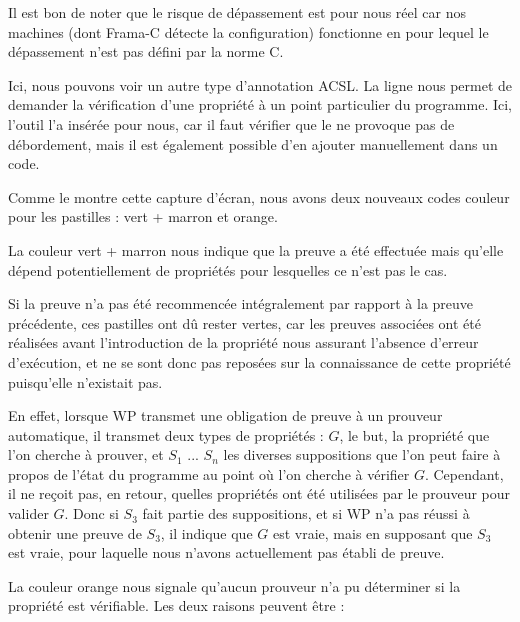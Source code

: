 

\begin{Information}
Il est bon de noter que le risque de dépassement est pour nous réel car nos
machines (dont Frama-C détecte la configuration) fonctionne en
pour lequel le dépassement n'est pas défini par la norme C.
\end{Information}


Ici, nous pouvons voir un autre type d'annotation ACSL. La
ligne  nous permet de demander la vérification
d'une propriété à un point particulier du programme. Ici, l'outil l'a
insérée pour nous, car il faut vérifier que le  ne provoque pas de
débordement, mais il est également possible d'en ajouter manuellement dans
un code.



Comme le montre cette capture d'écran, nous avons deux nouveaux codes couleur
pour les pastilles : vert + marron et orange.



La couleur vert + marron nous indique que la preuve a été effectuée mais
qu'elle dépend potentiellement de propriétés pour lesquelles ce n'est pas le
cas.



Si  la preuve n'a pas été recommencée intégralement par rapport à la preuve
précédente, ces pastilles ont dû rester vertes, car les preuves associées ont
été réalisées avant l'introduction de la propriété nous assurant l'absence
d'erreur d'exécution, et ne se sont donc pas reposées sur la connaissance de
cette propriété puisqu'elle n'existait pas.



En effet, lorsque WP transmet une obligation de preuve à un prouveur automatique,
il transmet deux types de propriétés : $G$, le but, la propriété
que l'on cherche à prouver, et $S_1$ ... $S_n$ les diverses suppositions que l'on
peut faire à propos de l'état du programme au point où l'on cherche à vérifier $G$.
Cependant, il ne reçoit pas, en retour, quelles propriétés ont été utilisées par
le prouveur pour valider $G$. Donc si $S_3$ fait partie des suppositions, et si
WP n'a pas réussi à obtenir une preuve de $S_3$, il indique que $G$ est vraie, mais
en supposant que $S_3$ est vraie, pour laquelle nous n'avons actuellement pas
établi de preuve.



La couleur orange nous signale qu'aucun prouveur n'a pu déterminer si la
propriété est vérifiable. Les deux raisons peuvent être :



